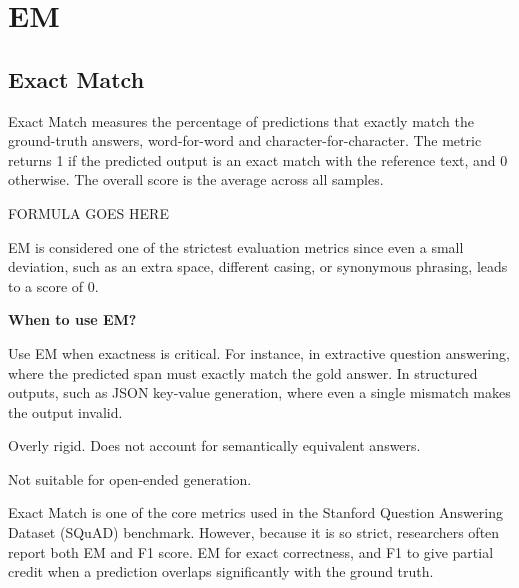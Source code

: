 \clearpage
\thispagestyle{nlpstyle}
\section{EM}
\subsection{Exact Match}

Exact Match measures the percentage of predictions that exactly match the ground-truth answers,
word-for-word and character-for-character. The metric returns 1 if the predicted output is an
exact match with the reference text, and 0 otherwise. The overall score is the average across all
samples.

\begin{center}
    FORMULA GOES HERE
\end{center}

EM is considered one of the strictest evaluation metrics since even a small deviation, such as an
extra space, different casing, or synonymous phrasing, leads to a score of 0.

\textbf{When to use EM?}

Use EM when exactness is critical. For instance, in extractive question answering, where the predicted
span must exactly match the gold answer. In structured outputs, such as JSON key-value generation,
where even a single mismatch makes the output invalid.

{
\item Overly rigid. Does not account for semantically equivalent answers.
\item Not suitable for open-ended generation.
}

\clearpage

{Exact Match is one of the core metrics used in the Stanford Question Answering Dataset (SQuAD)
benchmark. However, because it is so strict, researchers often report both EM and F1 score.
EM for exact correctness, and F1 to give partial credit when a prediction overlaps significantly with
the ground truth.}

